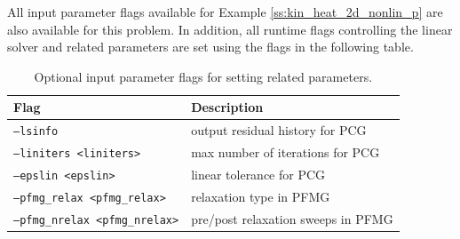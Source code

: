 All input parameter flags available for Example \ref{ss:kin_heat_2d_nonlin_p} are
also available for this problem.  In addition, all runtime flags controlling the
linear solver and {\hypre} related parameters are set using the flags in the
following table.
\begin{center}
\begin{table}
\caption{Optional input parameter flags for setting {\hypre} related parameters.}
\begin{tabular}{ |p{6cm}|p{10cm}| }
\hline
Flag & Description \\
\hline
{\tt --lsinfo} & output residual history for PCG\\
{\tt --liniters <liniters>} & max number of iterations for PCG\\
{\tt --epslin <epslin>} & linear tolerance for PCG\\
{\tt --pfmg\_relax <pfmg\_relax>} & relaxation type in PFMG\\
{\tt --pfmg\_nrelax <pfmg\_nrelax>} & pre/post relaxation sweeps in PFMG\\
\hline
\end{tabular}
\end{table}
\end{center}
